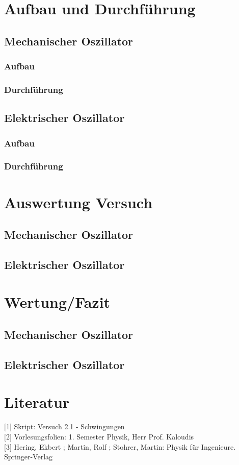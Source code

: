 \documentclass[a4paper]{scrartcl}
\numberwithin{equation}{subsection}
\begin{document}
\newpage

\section{Aufbau und Durchführung}
\subsection{Mechanischer Oszillator}
\subsubsection{Aufbau}
\subsubsection{Durchführung}

\subsection{Elektrischer Oszillator}
\subsubsection{Aufbau}
\subsubsection{Durchführung}

\newpage

\section{Auswertung Versuch}
\subsection{Mechanischer Oszillator}
\subsection{Elektrischer Oszillator}

\newpage

\section{Wertung/Fazit}
\subsection{Mechanischer Oszillator}
\subsection{Elektrischer Oszillator}

\newpage

\section{Literatur}
$[$1$]$ Skript: Versuch 2.1 - Schwingungen \\
$[$2$]$ Vorlesungsfolien: 1. Semester Physik, Herr Prof. Kaloudis \\
$[$3$]$ Hering, Ekbert ; Martin, Rolf ; Stohrer, Martin: Physik für Ingenieure. Springer-Verlag

\label{LastPage}
\end{document}

